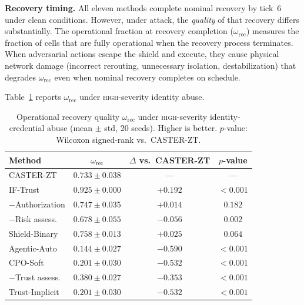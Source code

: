 \documentclass[10pt,journal,compsoc]{IEEEtran}
\begin{document}
\noindent\textbf{Recovery timing.}
All eleven methods complete nominal recovery by tick~6 under clean conditions.
However, under attack, the \emph{quality} of that recovery differs substantially.
The operational fraction at recovery completion ($\omega_{\mathrm{rec}}$) measures the fraction of cells that are fully operational when the recovery process terminates.
When adversarial actions escape the shield and execute, they cause physical network damage (incorrect rerouting, unnecessary isolation, destabilization) that degrades $\omega_{\mathrm{rec}}$ even when nominal recovery completes on schedule.

Table~\ref{tab:recovery_quality} reports $\omega_{\mathrm{rec}}$ under \textsc{high}-severity identity abuse.

\begin{table}[t]
\centering
\caption{Operational recovery quality $\omega_{\mathrm{rec}}$ under \textsc{high}-severity identity-credential abuse (mean $\pm$ std, 20 seeds).  Higher is better.  $p$-value: Wilcoxon signed-rank vs.\ CASTER-ZT.}
\label{tab:recovery_quality}
\begin{tabular}{lccc}
\toprule
Method & $\omega_{\mathrm{rec}}$ & $\Delta$ vs.\ CASTER-ZT & $p$-value \\
\midrule
CASTER-ZT           & $\mathbf{0.733\pm0.038}$ & ---   & --- \\
IF-Trust            & $0.925\pm0.000$ & $+0.192$ & ${<}0.001$ \\
$-$Authorization    & $0.747\pm0.035$ & $+0.014$ & $0.182$ \\
$-$Risk assess.     & $0.678\pm0.055$ & $-0.056$ & $0.002$ \\
Shield-Binary       & $0.758\pm0.013$ & $+0.025$ & $0.064$ \\
Agentic-Auto        & $0.144\pm0.027$ & $-0.590$ & ${<}0.001$ \\
CPO-Soft            & $0.201\pm0.030$ & $-0.532$ & ${<}0.001$ \\
$-$Trust assess.    & $0.380\pm0.027$ & $-0.353$ & ${<}0.001$ \\
Trust-Implicit      & $0.201\pm0.030$ & $-0.532$ & ${<}0.001$ \\
\bottomrule
\end{tabular}
\end{table}
\end{document}
